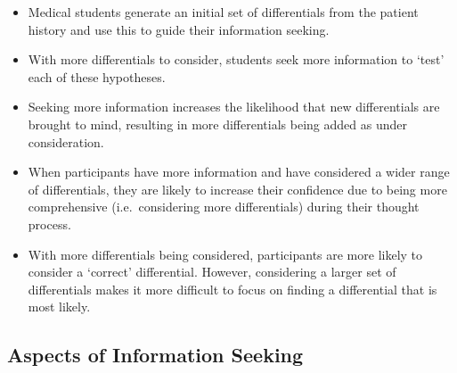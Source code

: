 \documentclass[a4paper, nobind]{templates/ociamthesis}
\providecommand{\tightlist}{%
  \setlength{\itemsep}{0pt}\setlength{\parskip}{0pt}}
\begin{document}
\begin{itemize}
\tightlist
\item
  Medical students generate an initial set of differentials from the patient history and use this to guide their information seeking.
\item
  With more differentials to consider, students seek more information to `test' each of these hypotheses.
\item
  Seeking more information increases the likelihood that new differentials are brought to mind, resulting in more differentials being added as under consideration.
\item
  When participants have more information and have considered a wider range of differentials, they are likely to increase their confidence due to being more comprehensive (i.e.~considering more differentials) during their thought process.
\item
  With more differentials being considered, participants are more likely to consider a `correct' differential. However, considering a larger set of differentials makes it more difficult to focus on finding a differential that is most likely.
\end{itemize}

\subsection{Aspects of Information Seeking}\label{aspects-of-information-seeking}
\end{document}
